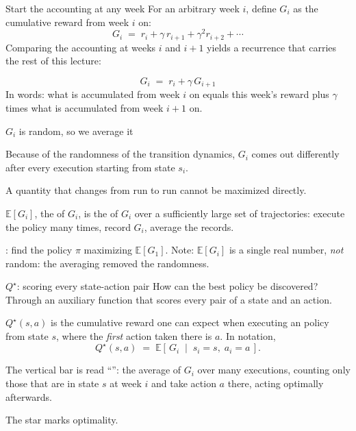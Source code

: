 \begin{frame}{Start the accounting at any week}
For an arbitrary week $i$, define $G_i$ as the cumulative reward from week $i$ on:
\[ G_i \;=\; r_i + \gamma\, r_{i+1} + \gamma^2 r_{i+2} + \cdots \]
\pause
Comparing the accounting at weeks $i$ and $i+1$ yields a recurrence that carries the rest of this lecture:
\begin{lbox}
\[ G_i \;=\; r_i + \gamma\, G_{i+1} \]
In words: what is accumulated from week $i$ on equals this week's reward plus $\gamma$ times what is accumulated from week $i+1$ on.
\end{lbox}
\end{frame}

\begin{frame}{$G_i$ is random, so we average it}
\begin{alertbox}[{\bf $G_i$ is random}]
Because of the randomness of the transition dynamics, $G_i$ comes out differently after every execution starting from state $s_i$.
\end{alertbox}
\vspace{-1.5mm}
A quantity that changes from run to run cannot be maximized directly.
\pause
\begin{lbox}
$\mathbb{E}[G_i]$, the  of $G_i$, is the  of $G_i$ over a sufficiently large set of trajectories: execute the policy many times, record $G_i$, average the records.
\end{lbox}
\pause
\begin{bullets}
\item {}: find the policy $\pi$ maximizing $\mathbb{E}[G_1]$. Note: $\mathbb{E}[G_i]$ is a single real number, \emph{not} random: the averaging removed the randomness.
\end{bullets}
\end{frame}


\begin{frame}{$Q^\star$: scoring every state-action pair}
How can the best policy be discovered? Through an auxiliary function that scores every pair of a state and an action.
\begin{lbox}
$Q^\star(s,a)$ is the cumulative reward one can expect when executing an  policy from state $s$, where the \emph{first} action taken there is $a$. In notation,
\[ Q^\star(s, a) \;=\; \mathbb{E}\left[\, G_i \;\middle|\; s_i = s,\; a_i = a \,\right]. \]
\end{lbox}
\pause
\begin{bullets}
\item The vertical bar is read ``'': the average of $G_i$ over many executions, counting only those that are in state $s$ at week $i$ and take action $a$ there, acting optimally afterwards.
\item The star marks optimality.
\end{bullets}
\end{frame}

